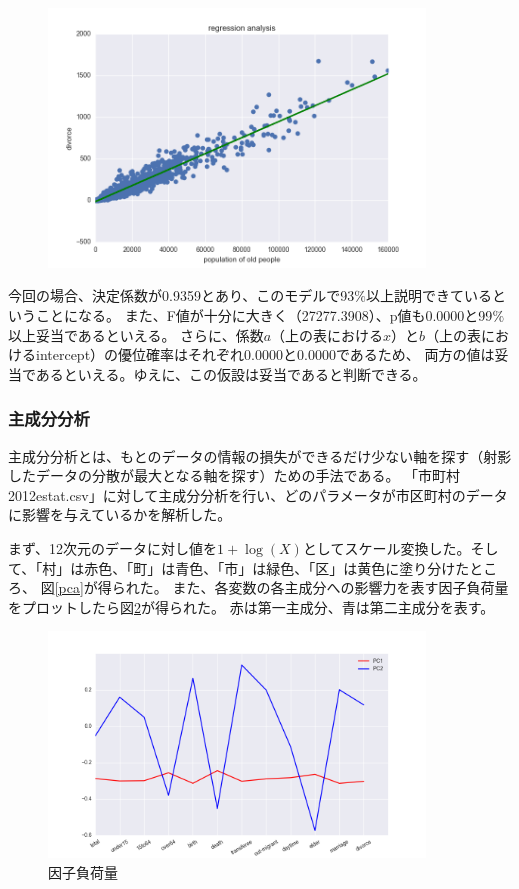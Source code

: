 \documentclass[a4paper,xelatex,ja=standard,jafont=hiragino-pron, 10pt]{bxjsarticle}
\begin{document}
\begin{figure}[!h]
  \centering
  \includegraphics[clip, width=10.0cm]{../data/picture/regression_od.png}
  \caption{}
  \label{regression_od}
\end{figure}

今回の場合、決定係数が0.9359とあり、このモデルで93$\%$以上説明できているということになる。
また、F値が十分に大きく（27277.3908）、p値も0.0000と99$\%$以上妥当であるといえる。
さらに、係数$a$（上の表における$x$）と$b$（上の表におけるintercept）の優位確率はそれぞれ0.0000と0.0000であるため、
両方の値は妥当であるといえる。ゆえに、この仮設は妥当であると判断できる。

\subsubsection{主成分分析}

主成分分析とは、もとのデータの情報の損失ができるだけ少ない軸を探す（射影したデータの分散が最大となる軸を探す）ための手法である。
「市町村 2012estat.csv」に対して主成分分析を行い、どのパラメータが市区町村のデータに影響を与えているかを解析した。

まず、12次元のデータに対し値を$1+\log(X)$としてスケール変換した。そして、「村」は赤色、「町」は青色、「市」は緑色、「区」は黄色に塗り分けたところ、
図\ref{pca}が得られた。
また、各変数の各主成分への影響⼒を表す因子負荷量をプロットしたら図\ref{pca_model}が得られた。
赤は第一主成分、青は第二主成分を表す。

\begin{figure}[ht]
  \centering
  \includegraphics[clip, width=10cm]{../data/picture/factor_components.png}
  \caption{因子負荷量}
  \label{pca_model}
\end{figure}
\end{document}
